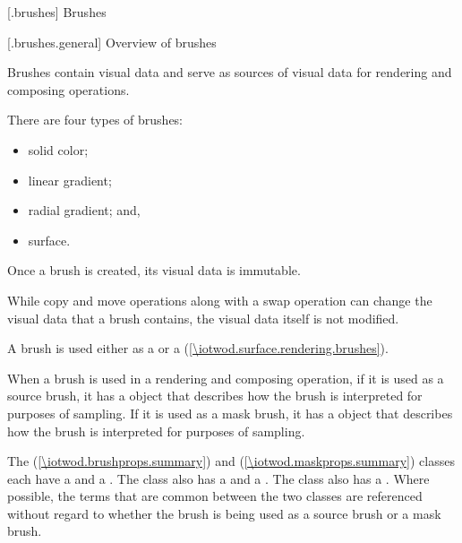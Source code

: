 
 [\iotwod.brushes] {Brushes}

 [\iotwod.brushes.general] {Overview of brushes}

\pnum
Brushes contain visual data and serve as sources of visual data for rendering and composing operations.

\pnum
There are four types of brushes:
\begin{itemize}
	\item solid color;
	\item linear gradient;
	\item radial gradient; and,
	\item surface.
\end{itemize}

\pnum
Once a brush is created, its visual data is immutable.

\pnum
\begin{note}
While copy and move operations along with a swap operation can change the visual data that a brush contains, the visual data itself is not modified.
\end{note}

\pnum
A brush is used either as a  or a  (\ref{\iotwod.surface.rendering.brushes}).

\pnum
When a brush is used in a rendering and composing operation, if it is used as a source brush, it has a  object that describes how the brush is interpreted for purposes of sampling. If it is used as a mask brush, it has a  object that describes how the brush is interpreted for purposes of sampling.

\pnum
The  (\ref{\iotwod.brushprops.summary}) and  (\ref{\iotwod.maskprops.summary}) classes each have a  and a . The  class also has a  and a . The  class also has a . Where possible, the terms that are common between the two classes are referenced without regard to whether the brush is being used as a source brush or a mask brush.

